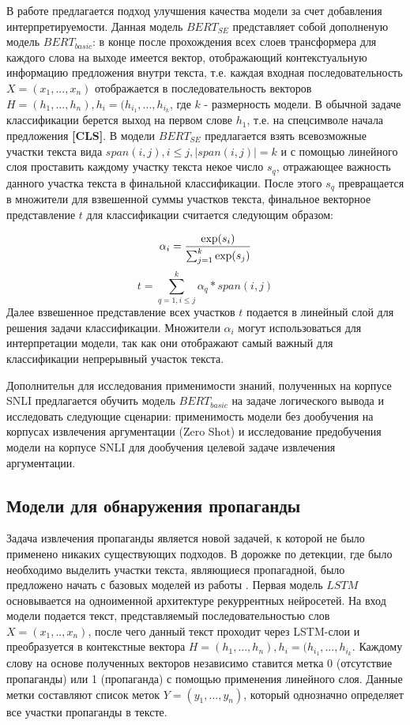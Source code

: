 В работе \cite{sun2020self} предлагается подход улучшения качества модели за счет добавления интерпретируемости. Данная модель $BERT_{SE}$ представляет собой дополненую модель $BERT_{basic}$: в конце после прохождения всех слоев трансформера для каждого слова на выходе имеется вектор, отображающий контекстуальную информацию предложения внутри текста, т.е. каждая входная последовательность $X = (x_1, ..., x_n)$ отображается в последовательность векторов $H = (h_1, ..., h_n), h_i = (h_{i_1}, ..., h_{i_k}$, где $k$ - размерность модели.
В обычной задаче классификации берется выход на первом слове $h_1$, т.е. на спецсимволе начала предложения \textbf{[CLS]}. В модели $BERT_{SE}$ предлагается взять всевозможные участки текста вида $span(i, j), i \leq j, |span(i, j)| = k$ и с помощью линейного слоя проставить каждому участку текста некое число $s_q$, отражающее важность данного участка текста в финальной классификации. После этого $s_q$ превращается в множители для взвешенной суммы участков текста, финальное векторное представление $t$ для классификации считается следующим образом:

\begin{equation*}
    \alpha_i = \frac{\exp(s_i)}{\sum_{j=1}^{k}\exp(s_j)} \\
\end{equation*}
\begin{equation*}
        t=\sum_{q=1, i \leq j}^{k} \alpha_q * span(i, j)
\end{equation*}
Далее взвешенное представление всех участков $t$ подается в линейный слой для решения задачи классификации. Множители $\alpha_i$ могут использоваться для интерпретации модели, так как они отображают самый важный для классификации непрерывный участок текста.


Дополнительн для исследования применимости знаний, полученных на корпусе SNLI предлагается обучить модель $BERT_{basic}$ на задаче логического вывода и исследовать следующие сценарии: применимость модели без дообучения на корпусах извлечения аргументации (Zero Shot) и исследование предобучения модели на корпусе SNLI для дообучения целевой задаче извлечения аргументации. 

\subsection{Модели для обнаружения пропаганды}
Задача извлечения пропаганды является новой задачей, к которой не было применено никаких существующих подходов. В дорожке по детекции, где было необходимо выделить участки текста, являющиеся пропагадной, было предложено начать с базовых моделей из работы \cite{lample2016neural}. Первая модель $LSTM$ основывается на одноименной архитектуре рекуррентных нейросетей. На вход модели подается текст, представляемый последовательностью слов $X = (x_1, .., x_n)$, после чего данный текст проходит через LSTM-слои и преобразуется в контекстные вектора $H = (h_1, ..., h_n), h_i = (h_{i_1}, ..., h_{i_k}$. Каждому слову на основе полученных векторов независимо ставится метка 0 (отсутствие пропаганды) или 1 (пропаганда) с помощью применения линейного слоя. Данные метки составляют список меток $Y = (y_1, ..., y_n)$, который однозначно определяет все участки пропаганды в тексте.

